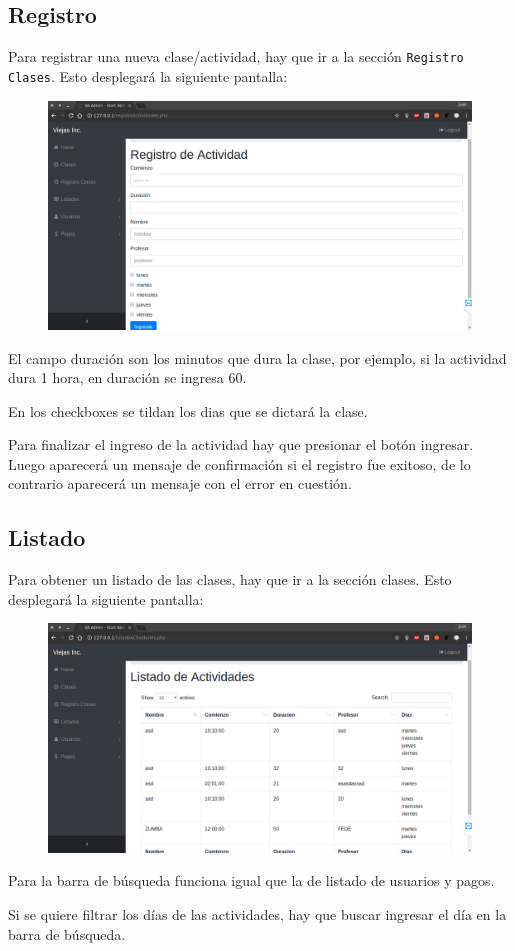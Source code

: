 \documentclass[a4paper, 12pt, spanish]{report}
\begin{document}
\subsection{Registro}
\par Para registrar una nueva clase/actividad, hay que ir a la sección \verb|Registro Clases|. Esto desplegará la siguiente pantalla:
\begin{figure}[H]
	\centering
	\includegraphics[width=\linewidth]{imagenes/ac_reg}
	\label{fig:acreg}
\end{figure}
\par El campo duración son los minutos que dura la clase, por ejemplo, si la actividad dura 1 hora, en duración se ingresa 60.
\par En los checkboxes se tildan los dias que se dictará la clase.
\par Para finalizar el ingreso de la actividad hay que presionar el botón ingresar. Luego aparecerá un mensaje de confirmación si el registro fue exitoso, de lo contrario aparecerá un mensaje con el error en cuestión.
\subsection{Listado}
\par Para obtener un listado de las clases, hay que ir a la sección clases. Esto desplegará la siguiente pantalla:
\begin{figure}[H]
	\centering
	\includegraphics[width=\linewidth]{imagenes/ac_list}
	\caption{}
	\label{fig:aclist}
\end{figure}
\par Para la barra de búsqueda funciona igual que la de listado de usuarios y pagos.
\par Si se quiere filtrar los días de las actividades, hay que buscar ingresar el día en la barra de búsqueda.
\end{document}
